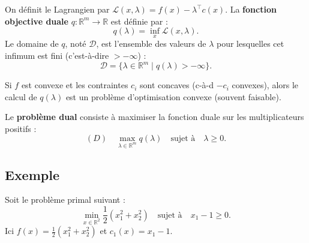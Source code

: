 \begin{definition}
    On définit le Lagrangien par $\mathcal{L}(x, \lambda) = f(x) - \lambda^\top c(x)$.
    La \textbf{fonction objective duale} $q: \mathbb{R}^m \to \mathbb{R}$ est définie par :
    \begin{equation}
        q(\lambda) = \inf_x \mathcal{L}(x, \lambda).
    \end{equation}
    Le domaine de $q$, noté $\mathcal{D}$, est l'ensemble des valeurs de $\lambda$ pour lesquelles cet infimum est fini (c'est-à-dire $> -\infty$) :
    \begin{equation}
        \mathcal{D} = \{ \lambda \in \mathbb{R}^m \mid q(\lambda) > -\infty \}.
    \end{equation}
\end{definition}

Si $f$ est convexe et les contraintes $c_i$ sont concaves (c-à-d $-c_i$ convexes), alors le calcul de $q(\lambda)$ est un problème d'optimisation convexe (souvent faisable).

\begin{definition}
    Le \textbf{problème dual} consiste à maximiser la fonction duale sur les multiplicateurs positifs :
    \begin{equation}
        (D) \quad \max_{\lambda \in \mathbb{R}^m} q(\lambda) \quad \text{sujet à} \quad \lambda \geq 0.
    \end{equation}
\end{definition}

\subsection{Exemple}

Soit le problème primal suivant :
\begin{equation}
    \min_{x \in \mathbb{R}^2} \frac{1}{2}(x_1^2 + x_2^2) \quad \text{sujet à} \quad x_1 - 1 \geq 0.
\end{equation}
Ici $f(x) = \frac{1}{2}(x_1^2 + x_2^2)$ et $c_1(x) = x_1 - 1$.

